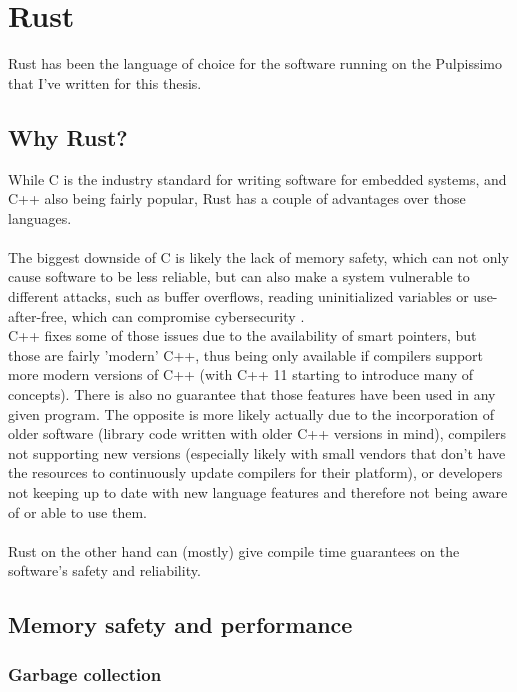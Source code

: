 \section{Rust}

Rust \cite{rustlang} has been the language of choice for the software running on the Pulpissimo \cite{pulpissimo} that I've written for this thesis.

\subsection{Why Rust?}

While C is the industry standard for writing software for embedded systems, and C++ also being fairly popular, Rust has a couple of
advantages over those languages.\\\\
The biggest downside of C is likely the lack of memory safety, which can not only cause software to be less reliable, but
can also make a system vulnerable to different attacks, such as buffer overflows, reading uninitialized variables or use-after-free, which can compromise cybersecurity \cite{memory_safety}.\\
C++ fixes some of those issues due to the availability of smart pointers, but those are fairly 'modern' C++, thus being only available if compilers support more modern
versions of C++ (with C++ 11 starting to introduce many of concepts).
There is also no guarantee that those features have been used in any given program.
The opposite is more likely actually due to the incorporation of older software (library code written with older C++ versions in mind),
compilers not supporting new versions (especially likely with small vendors that don't have the resources to continuously update compilers for their platform),
or developers not keeping up to date with new language features and therefore not being aware of or able to use them.\\\\
Rust on the other hand can (mostly) give compile time guarantees on the software's safety and reliability.

\subsection{Memory safety and  performance}

\subsubsection{Garbage collection}

